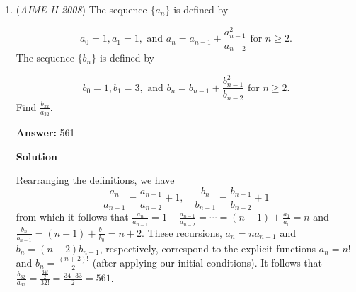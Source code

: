 \begin{enumerate}
 


 



\textbf{Solution 10 (Lazy Solution/Guesstimation)}

Drop perpendiculars on $AD$ from $B$ and $C$ at $X$ and $Y$

 You can see $XY = 2008-1000 = 1008$.

 Let $YD = a$ and $MN = BX = CY = h$.

 Let $AX = 1008 - a$.

 We will also get $YCD = XAB = 37°$.

 Observe that:
 \[\tan 37^\circ = \frac{h}{1008-a} = \frac{a}{h}\]

 Solving for h:

 
 \[h = \sqrt{(a)(1008-a)}\]

 To obtain h from $0 \leq h \leq 999$, only possible natural value of $h$ is $504$ when $(1008-a) = a$

 Hence $\boxed{h = 504}$

 Note: You can also complete the square in the above equation and then see that the only solution is 504.

 


	\item (\textit{AIME II 2008}) The sequence $\{a_n\}$ is defined by

 \[a_0 = 1,a_1 = 1, \text{ and } a_n = a_{n - 1} + \frac {a_{n - 1}^2}{a_{n - 2}}\text{ for }n\ge2.\]
The sequence $\{b_n\}$ is defined by

 \[b_0 = 1,b_1 = 3, \text{ and } b_n = b_{n - 1} + \frac {b_{n - 1}^2}{b_{n - 2}}\text{ for }n\ge2.\]
Find $\frac {b_{32}}{a_{32}}$.


 
 \textbf{Answer: }561



\textbf{Solution}

Rearranging the definitions, we have
 \[\frac{a_n}{a_{n-1}} = \frac{a_{n-1}}{a_{n-2}} + 1,\quad \frac{b_n}{b_{n-1}} = \frac{b_{n-1}}{b_{n-2}} + 1\]from which it follows that $\frac{a_n}{a_{n-1}} = 1+ \frac{a_{n-1}}{a_{n-2}} = \cdots = (n-1) + \frac{a_{1}}{a_0} = n$ and $\frac{b_n}{b_{n-1}} = (n-1) + \frac{b_{1}}{b_0} = n+2$. These \href{https://artofproblemsolving.com/wiki/index.php?title=Recursion}{recursions}, $a_{n} = na_{n-1}$ and $b_{n} = (n+2)b_{n-1}$, respectively, correspond to the explicit functions $a_n = n!$ and $b_n = \frac{(n+2)!}{2}$ (after applying our initial conditions). It follows that $\frac{b_{32}}{a_{32}} = \frac{\frac{34!}{2}}{32!} = \frac{34 \cdot 33}{2} = \boxed{561}$.


\end{enumerate}
